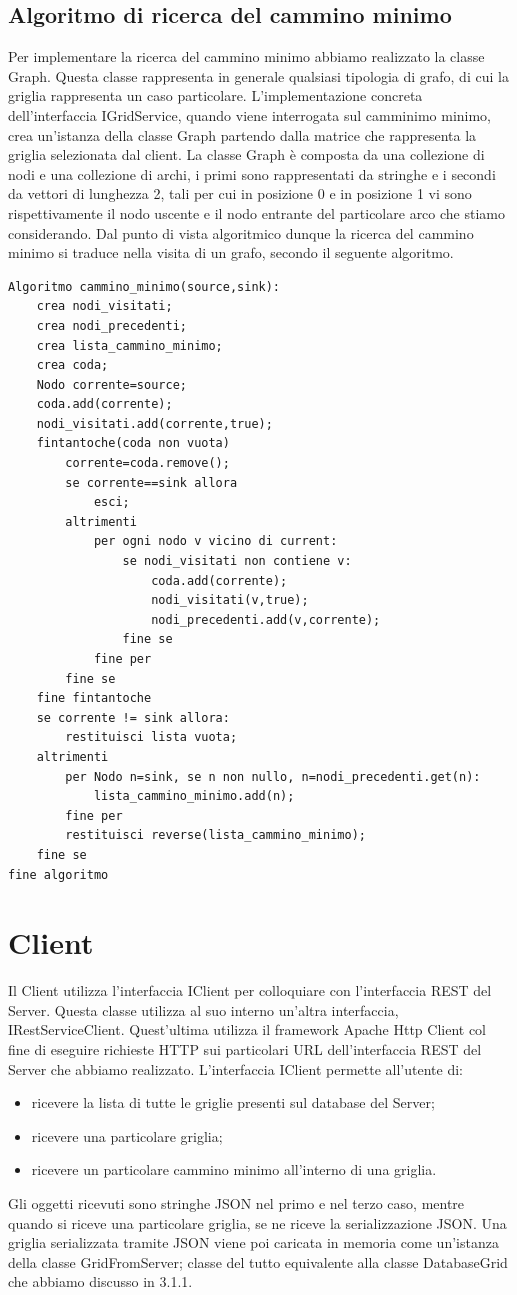 \subsection{Algoritmo di ricerca del cammino minimo}
Per implementare la ricerca del cammino minimo abbiamo realizzato la classe Graph. Questa classe rappresenta in generale qualsiasi tipologia di grafo, di cui la griglia rappresenta un caso particolare. L'implementazione concreta dell'interfaccia IGridService, quando viene interrogata sul camminimo minimo, crea un'istanza della classe Graph partendo dalla matrice che rappresenta la griglia selezionata dal client. La classe Graph \`e composta da una collezione di nodi e una collezione di archi, i primi sono rappresentati da stringhe e i secondi da vettori di lunghezza 2, tali per cui in posizione 0 e in posizione 1 vi sono rispettivamente il nodo uscente e il nodo entrante del particolare arco che stiamo considerando. Dal punto di vista algoritmico dunque la ricerca del cammino minimo si traduce nella visita di un grafo, secondo il seguente algoritmo.
\newpage
\scriptsize
\begin{lstlisting}
Algoritmo cammino_minimo(source,sink):
	crea nodi_visitati;
	crea nodi_precedenti;
	crea lista_cammino_minimo;
	crea coda;
	Nodo corrente=source;
	coda.add(corrente);
	nodi_visitati.add(corrente,true);
	fintantoche(coda non vuota)
		corrente=coda.remove();
		se corrente==sink allora 
			esci;
		altrimenti
			per ogni nodo v vicino di current:
				se nodi_visitati non contiene v:
					coda.add(corrente);
					nodi_visitati(v,true);
					nodi_precedenti.add(v,corrente);
				fine se
			fine per
		fine se
	fine fintantoche
	se corrente != sink allora:
		restituisci lista vuota;
	altrimenti
		per Nodo n=sink, se n non nullo, n=nodi_precedenti.get(n):
			lista_cammino_minimo.add(n);
		fine per
		restituisci reverse(lista_cammino_minimo);
	fine se
fine algoritmo
\end{lstlisting}
\section{Client}
Il Client utilizza l'interfaccia IClient per colloquiare con l'interfaccia REST del Server. Questa classe utilizza al suo interno un'altra interfaccia, IRestServiceClient. Quest'ultima utilizza il framework Apache Http Client col fine di eseguire richieste HTTP sui particolari URL dell'interfaccia REST del Server che abbiamo realizzato. L'interfaccia IClient permette all'utente di:
\begin{itemize}
	\item ricevere la lista di tutte le griglie presenti sul database del Server;
	\item ricevere una particolare griglia;
	\item ricevere un particolare cammino minimo all'interno di una griglia.
\end{itemize}
Gli oggetti ricevuti sono stringhe JSON nel primo e nel terzo caso, mentre quando si riceve una particolare griglia, se ne riceve la serializzazione JSON. Una griglia serializzata tramite JSON viene poi caricata in memoria come un'istanza della classe GridFromServer; classe del tutto equivalente alla classe DatabaseGrid che abbiamo discusso in 3.1.1.

